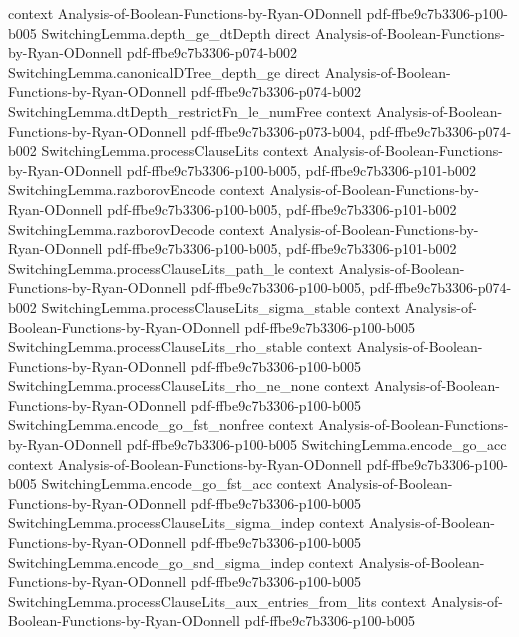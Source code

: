 \begin{theorem}
  {context}
  {Analysis-of-Boolean-Functions-by-Ryan-ODonnell}
  {pdf-ffbe9c7b3306-p100-b005}
\proofstep
  {SwitchingLemma.depth_ge_dtDepth}
  {direct}
  {Analysis-of-Boolean-Functions-by-Ryan-ODonnell}
  {pdf-ffbe9c7b3306-p074-b002}
\proofstep
  {SwitchingLemma.canonicalDTree_depth_ge}
  {direct}
  {Analysis-of-Boolean-Functions-by-Ryan-ODonnell}
  {pdf-ffbe9c7b3306-p074-b002}
\proofstep
  {SwitchingLemma.dtDepth_restrictFn_le_numFree}
  {context}
  {Analysis-of-Boolean-Functions-by-Ryan-ODonnell}
  {pdf-ffbe9c7b3306-p073-b004,
    pdf-ffbe9c7b3306-p074-b002}
\proofstep
  {SwitchingLemma.processClauseLits}
  {context}
  {Analysis-of-Boolean-Functions-by-Ryan-ODonnell}
  {pdf-ffbe9c7b3306-p100-b005,
    pdf-ffbe9c7b3306-p101-b002}
\proofstep
  {SwitchingLemma.razborovEncode}
  {context}
  {Analysis-of-Boolean-Functions-by-Ryan-ODonnell}
  {pdf-ffbe9c7b3306-p100-b005,
    pdf-ffbe9c7b3306-p101-b002}
\proofstep
  {SwitchingLemma.razborovDecode}
  {context}
  {Analysis-of-Boolean-Functions-by-Ryan-ODonnell}
  {pdf-ffbe9c7b3306-p100-b005,
    pdf-ffbe9c7b3306-p101-b002}
\proofstep
  {SwitchingLemma.processClauseLits_path_le}
  {context}
  {Analysis-of-Boolean-Functions-by-Ryan-ODonnell}
  {pdf-ffbe9c7b3306-p100-b005,
    pdf-ffbe9c7b3306-p074-b002}
\proofstep
  {SwitchingLemma.processClauseLits_sigma_stable}
  {context}
  {Analysis-of-Boolean-Functions-by-Ryan-ODonnell}
  {pdf-ffbe9c7b3306-p100-b005}
\proofstep
  {SwitchingLemma.processClauseLits_rho_stable}
  {context}
  {Analysis-of-Boolean-Functions-by-Ryan-ODonnell}
  {pdf-ffbe9c7b3306-p100-b005}
\proofstep
  {SwitchingLemma.processClauseLits_rho_ne_none}
  {context}
  {Analysis-of-Boolean-Functions-by-Ryan-ODonnell}
  {pdf-ffbe9c7b3306-p100-b005}
\proofstep
  {SwitchingLemma.encode_go_fst_nonfree}
  {context}
  {Analysis-of-Boolean-Functions-by-Ryan-ODonnell}
  {pdf-ffbe9c7b3306-p100-b005}
\proofstep
  {SwitchingLemma.encode_go_acc}
  {context}
  {Analysis-of-Boolean-Functions-by-Ryan-ODonnell}
  {pdf-ffbe9c7b3306-p100-b005}
\proofstep
  {SwitchingLemma.encode_go_fst_acc}
  {context}
  {Analysis-of-Boolean-Functions-by-Ryan-ODonnell}
  {pdf-ffbe9c7b3306-p100-b005}
\proofstep
  {SwitchingLemma.processClauseLits_sigma_indep}
  {context}
  {Analysis-of-Boolean-Functions-by-Ryan-ODonnell}
  {pdf-ffbe9c7b3306-p100-b005}
\proofstep
  {SwitchingLemma.encode_go_snd_sigma_indep}
  {context}
  {Analysis-of-Boolean-Functions-by-Ryan-ODonnell}
  {pdf-ffbe9c7b3306-p100-b005}
\proofstep
  {SwitchingLemma.processClauseLits_aux_entries_from_lits}
  {context}
  {Analysis-of-Boolean-Functions-by-Ryan-ODonnell}
  {pdf-ffbe9c7b3306-p100-b005}

\end{theorem}

